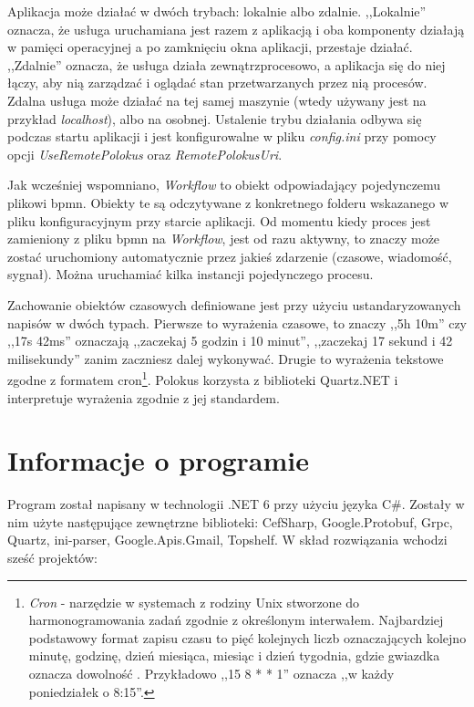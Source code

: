 \documentclass[declaration,shortabstract,mgr]{iithesis}
\begin{document}
Aplikacja może działać w dwóch trybach: lokalnie albo zdalnie. ,,Lokalnie'' oznacza, że usługa uruchamiana jest 
razem z aplikacją i oba komponenty działają w pamięci operacyjnej a po zamknięciu okna aplikacji, przestaje działać. ,,Zdalnie'' oznacza, że usługa działa zewnątrzprocesowo, a aplikacja się do niej łączy, aby nią zarządzać i oglądać stan przetwarzanych przez nią procesów. Zdalna usługa może działać na tej samej maszynie (wtedy używany jest na przykład \textit{localhost}), albo na osobnej. Ustalenie trybu działania odbywa się podczas startu aplikacji i jest konfigurowalne w pliku \emph{config.ini} przy pomocy opcji \textit{UseRemotePolokus} oraz \textit{RemotePolokusUri}.

Jak wcześniej wspomniano, \textit{Workflow} to obiekt odpowiadający pojedynczemu plikowi bpmn. Obiekty te są odczytywane z konkretnego folderu wskazanego w pliku konfiguracyjnym przy starcie aplikacji. Od momentu kiedy proces jest zamieniony z pliku bpmn na \textit{Workflow}, jest od razu aktywny, to znaczy może zostać uruchomiony automatycznie przez jakieś zdarzenie (czasowe, wiadomość, sygnał). Można uruchamiać kilka instancji pojedynczego procesu.

Zachowanie obiektów czasowych definiowane jest przy użyciu ustandaryzowanych napisów w dwóch typach. Pierwsze to wyrażenia czasowe, to znaczy ,,5h 10m'' czy ,,17s 42ms'' oznaczają ,,zaczekaj 5 godzin i 10 minut'', ,,zaczekaj 17 sekund i 42 milisekundy'' zanim zaczniesz dalej wykonywać. Drugie to wyrażenia tekstowe
zgodne z formatem cron\footnote{\textit{Cron} - narzędzie w systemach z rodziny Unix stworzone do harmonogramowania zadań zgodnie z określonym interwałem. Najbardziej podstawowy format zapisu czasu to pięć kolejnych liczb oznaczających kolejno minutę, godzinę, dzień miesiąca, miesiąc i dzień tygodnia, gdzie gwiazdka oznacza dowolność \cite{wiki-cron}. Przykładowo ,,15 8 * * 1'' oznacza ,,w każdy poniedziałek o 8:15''.}. Polokus korzysta z biblioteki Quartz.NET i interpretuje wyrażenia zgodnie z jej standardem.

\section{Informacje o programie}

Program został napisany w technologii .NET 6 przy użyciu języka C\#. Zostały w nim użyte następujące zewnętrzne biblioteki: CefSharp, Google.Protobuf, Grpc, Quartz, ini-parser, Google.Apis.Gmail, Topshelf. W skład rozwiązania wchodzi sześć projektów:
\end{document}
